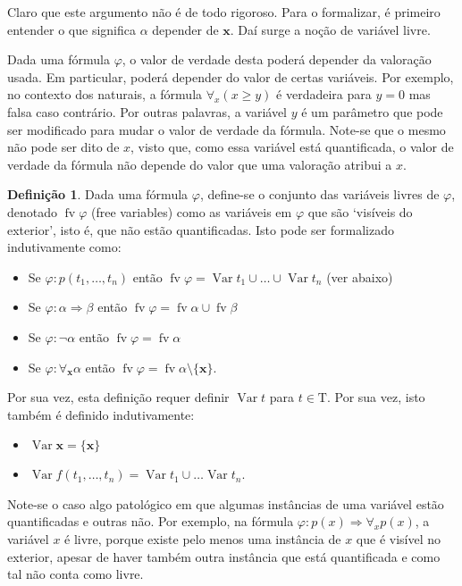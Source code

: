 \documentclass{report}
\theoremstyle{definition}
\newtheorem{definicao}{Definição}
\theoremstyle{remark}
\renewcommand{\bf}[1]{\mathbf{#1}}
\newcommand{\T}{\mathrm{T}}
\DeclareMathOperator{\var}{Var}
\DeclareMathOperator{\fv}{fv}
\newcommand{\imply}{\mathbin{\Rightarrow}}
\begin{document}
	Claro que este argumento não é de todo rigoroso. Para o formalizar, é primeiro entender o que significa $\alpha$ depender de $\bf x$. Daí surge a noção de variável livre.
	
	Dada uma fórmula $\varphi$, o valor de verdade desta poderá depender da valoração usada. Em particular, poderá depender do valor de certas variáveis. Por exemplo, no contexto dos naturais, a fórmula $\forall_x (x \geq y)$ é verdadeira para $y = 0$ mas falsa caso contrário. Por outras palavras, a variável $y$ é um parâmetro que pode ser modificado para mudar o valor de verdade da fórmula. Note-se que o mesmo não pode ser dito de $x$, visto que, como essa variável está quantificada, o valor de verdade da fórmula não depende do valor que uma valoração atribui a $x$.
	
	\begin{definicao}
	Dada uma fórmula $\varphi$, define-se o conjunto das variáveis livres de $\varphi$, denotado $\fv \varphi$ (free variables) como as variáveis em $\varphi$ que são `visíveis do exterior', isto é, que não estão quantificadas. Isto pode ser formalizado indutivamente como:
	
	\begin{itemize}
	\item Se $\varphi : p(t_1,\dots,t_n)$ então $\fv \varphi = \var t_1 \cup \dots \cup \var t_n$ (ver abaixo)
	
	\item Se $\varphi : \alpha \imply \beta$ então $\fv \varphi = \fv \alpha \cup \fv \beta$
	
	\item Se $\varphi : \neg \alpha$ então $\fv \varphi = \fv \alpha$
	
	\item Se $\varphi : \forall_{\bf x} \alpha$ então $\fv \varphi = \fv \alpha \setminus \{\bf x\}$.
	\end{itemize}
	
	Por sua vez, esta definição requer definir $\var t$ para $t \in \T$. Por sua vez, isto também é definido indutivamente:
	
	\begin{itemize}
	\item $\var \bf x = \{\bf x\}$
	
	\item $\var f(t_1, \dots, t_n) = \var t_1 \cup \dots \var t_n$.
	\end{itemize}
	\end{definicao}
	
	Note-se o caso algo patológico em que algumas instâncias de uma variável estão quantificadas e outras não. Por exemplo, na fórmula $\varphi : p(x) \imply \forall_x p(x)$, a variável $x$ é livre, porque existe pelo menos uma instância de $x$ que é visível no exterior, apesar de haver também outra instância que está quantificada e como tal não conta como livre.
	
\end{document}
